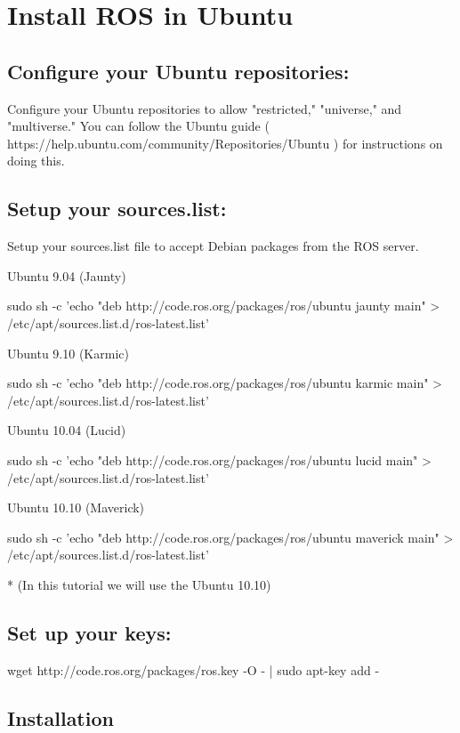 \chapter{Install ROS in Ubuntu}

\section{Configure your Ubuntu repositories:}

Configure your Ubuntu repositories to allow "restricted," "universe," and "multiverse." You can follow the Ubuntu guide ( https://help.ubuntu.com/community/Repositories/Ubuntu ) for instructions on doing this.

\section{Setup your sources.list:}


Setup your sources.list file to accept Debian packages from the ROS server.  

Ubuntu 9.04 (Jaunty)

sudo sh -c 'echo "deb http://code.ros.org/packages/ros/ubuntu jaunty main" > /etc/apt/sources.list.d/ros-latest.list'

 

Ubuntu 9.10 (Karmic)

sudo sh -c 'echo "deb http://code.ros.org/packages/ros/ubuntu karmic main" > /etc/apt/sources.list.d/ros-latest.list'

Ubuntu 10.04 (Lucid)

sudo sh -c 'echo "deb http://code.ros.org/packages/ros/ubuntu lucid main" > /etc/apt/sources.list.d/ros-latest.list'

Ubuntu 10.10 (Maverick)

sudo sh -c 'echo "deb http://code.ros.org/packages/ros/ubuntu maverick main" > /etc/apt/sources.list.d/ros-latest.list'

* (In this tutorial we will use the Ubuntu 10.10)


\section{Set up your keys:}

wget http://code.ros.org/packages/ros.key -O - | sudo apt-key add -

\section{Installation}

